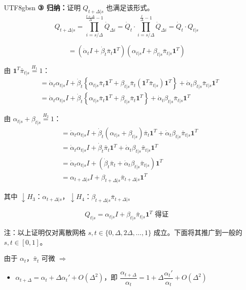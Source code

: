 \documentclass[11pt,a4paper]{article}
\begin{document}
\begin{CJK}{UTF8}{gbsn}
\textbf{③ 归纳：}证明 $Q_{t+\Delta|s}$ 也满足该形式。
\[
Q_{t+\Delta|s} = \prod_{i=s/\Delta}^{\frac{t+\Delta}{\Delta}-1} \dot{Q}_{\Delta i} = \dot{Q}_t \cdot \prod_{i=s/\Delta}^{\frac{t}{\Delta}-1} \dot{Q}_{\Delta i} = \dot{Q}_t \cdot Q_{t|s}
\]

\[
= (\dot{\alpha}_t I + \dot{\beta}_t \bar{\pi}_t \mathbf{1}^T)(\alpha_{t|s} I + \beta_{t|s} \bar{\pi}_{t|s} \mathbf{1}^T)
\]

由 $\mathbf{1}^T \bar{\pi}_{t|s} \stackrel{H_1}{=} 1$：
\begin{align*}
&= \dot{\alpha}_t \alpha_{t|s} I + \dot{\beta}_t \left\{ \alpha_{t|s} \bar{\pi}_t \mathbf{1}^T + \beta_{t|s} \bar{\pi}_t (\mathbf{1}^T \bar{\pi}_{t|s}) \mathbf{1}^T \right\} + \dot{\alpha}_t \beta_{t|s} \bar{\pi}_{t|s} \mathbf{1}^T \\
&= \dot{\alpha}_t \alpha_{t|s} I + \dot{\beta}_t \left\{ \alpha_{t|s} \bar{\pi}_t \mathbf{1}^T + \beta_{t|s} \bar{\pi}_t \mathbf{1}^T \right\} + \dot{\alpha}_t \beta_{t|s} \bar{\pi}_{t|s} \mathbf{1}^T
\end{align*}

由 $\alpha_{t|s} + \beta_{t|s} \stackrel{H_2}{=} 1$：
\begin{align*}
&= \dot{\alpha}_t \alpha_{t|s} I + \dot{\beta}_t (\alpha_{t|s} + \beta_{t|s}) \bar{\pi}_t \mathbf{1}^T + \dot{\alpha}_t \beta_{t|s} \bar{\pi}_{t|s} \mathbf{1}^T \\
&= \dot{\alpha}_t \alpha_{t|s} I + \dot{\beta}_t \bar{\pi}_t \mathbf{1}^T + \dot{\alpha}_t \beta_{t|s} \bar{\pi}_{t|s} \mathbf{1}^T \\
&= \dot{\alpha}_t \alpha_{t|s} I + (\dot{\beta}_t \bar{\pi}_t + \dot{\alpha}_t \beta_{t|s} \bar{\pi}_{t|s}) \mathbf{1}^T \\
&= \alpha_{t+\Delta|s} I + \beta_{t+\Delta|s} \bar{\pi}_{t+\Delta|s} \mathbf{1}^T
\end{align*}

其中 $\downarrow H_3$：$\alpha_{t+\Delta|s}$，$\downarrow H_4$：$\beta_{t+\Delta|s} \bar{\pi}_{t+\Delta|s}$

\[
Q_{t|s} = \alpha_{t|s} I + \beta_{t|s} \bar{\pi}_{t|s} \mathbf{1}^T \text{ 得证}
\]

注：以上证明仅对离散网格 $s, t \in \{0, \Delta, 2\Delta, \ldots, 1\}$ 成立。下面将其推广到一般的 $s, t \in [0,1]$。

由于 $\alpha_t$，$\bar{\pi}_t$ 可微 $\Rightarrow$
\begin{itemize}[leftmargin=2em]
\item $\alpha_{t+\Delta} = \alpha_t + \Delta \alpha_t' + O(\Delta^2)$，即 $\dfrac{\alpha_{t+\Delta}}{\alpha_t} = 1 + \Delta \dfrac{\alpha_t'}{\alpha_t} + O(\Delta^2)$


\end{itemize}
\end{CJK}
\end{document}

